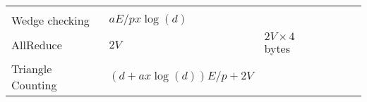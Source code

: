\documentclass[10pt,oneside]{memoir}
\begin{document}
\begin{longtable}[]{@{}llllll@{}}
\begin{minipage}[t]{0.19\columnwidth}
\strut
\end{minipage} & \begin{minipage}[t]{0.11\columnwidth}\raggedright
\strut
\end{minipage} & \begin{minipage}[t]{0.12\columnwidth}\raggedright
\strut
\end{minipage}\tabularnewline
\begin{minipage}[t]{0.19\columnwidth}\raggedright
Wedge checking\strut
\end{minipage} & \begin{minipage}[t]{0.10\columnwidth}\raggedright
\(aE/p x \log(d)\)\strut
\end{minipage} & \begin{minipage}[t]{0.13\columnwidth}\raggedright
\strut
\end{minipage} & \begin{minipage}[t]{0.19\columnwidth}\raggedright
\strut
\end{minipage} & \begin{minipage}[t]{0.11\columnwidth}\raggedright
\strut
\end{minipage} & \begin{minipage}[t]{0.12\columnwidth}\raggedright
\strut
\end{minipage}\tabularnewline
\begin{minipage}[t]{0.19\columnwidth}\raggedright
AllReduce\strut
\end{minipage} & \begin{minipage}[t]{0.10\columnwidth}\raggedright
\(2V\)\strut
\end{minipage} & \begin{minipage}[t]{0.13\columnwidth}\raggedright
\(2V \times 4\) bytes\strut
\end{minipage} & \begin{minipage}[t]{0.19\columnwidth}\raggedright
\strut
\end{minipage} & \begin{minipage}[t]{0.11\columnwidth}\raggedright
\strut
\end{minipage} & \begin{minipage}[t]{0.12\columnwidth}\raggedright
\strut
\end{minipage}\tabularnewline
\begin{minipage}[t]{0.19\columnwidth}\raggedright
Triangle Counting\strut
\end{minipage} & \begin{minipage}[t]{0.10\columnwidth}\raggedright
\((d + a x \log(d))E/p + 2V\)\strut

\end{minipage}
\end{longtable}
\end{document}
